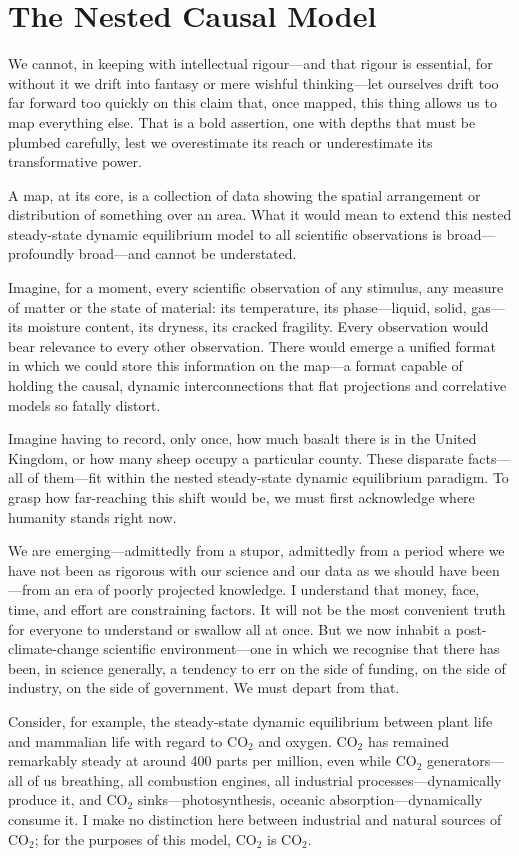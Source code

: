 \chapter{The Nested Causal Model}

We cannot, in keeping with intellectual rigour—and that rigour is essential, for without it we drift into fantasy or mere wishful thinking—let ourselves drift too far forward too quickly on this claim that, once mapped, this thing allows us to map everything else. That is a bold assertion, one with depths that must be plumbed carefully, lest we overestimate its reach or underestimate its transformative power.

A map, at its core, is a collection of data showing the spatial arrangement or distribution of something over an area. What it would mean to extend this nested steady-state dynamic equilibrium model to all scientific observations is broad—profoundly broad—and cannot be understated.

Imagine, for a moment, every scientific observation of any stimulus, any measure of matter or the state of material: its temperature, its phase—liquid, solid, gas—its moisture content, its dryness, its cracked fragility. Every observation would bear relevance to every other observation. There would emerge a unified format in which we could store this information on the map—a format capable of holding the causal, dynamic interconnections that flat projections and correlative models so fatally distort.

Imagine having to record, only once, how much basalt there is in the United Kingdom, or how many sheep occupy a particular county. These disparate facts—all of them—fit within the nested steady-state dynamic equilibrium paradigm. To grasp how far-reaching this shift would be, we must first acknowledge where humanity stands right now.

We are emerging—admittedly from a stupor, admittedly from a period where we have not been as rigorous with our science and our data as we should have been—from an era of poorly projected knowledge. I understand that money, face, time, and effort are constraining factors. It will not be the most convenient truth for everyone to understand or swallow all at once. But we now inhabit a post-climate-change scientific environment—one in which we recognise that there has been, in science generally, a tendency to err on the side of funding, on the side of industry, on the side of government. We must depart from that.

Consider, for example, the steady-state dynamic equilibrium between plant life and mammalian life with regard to CO$_2$ and oxygen. CO$_2$ has remained remarkably steady at around 400 parts per million, even while CO$_2$ generators—all of us breathing, all combustion engines, all industrial processes—dynamically produce it, and CO$_2$ sinks—photosynthesis, oceanic absorption—dynamically consume it. I make no distinction here between industrial and natural sources of CO$_2$; for the purposes of this model, CO$_2$ is CO$_2$.

